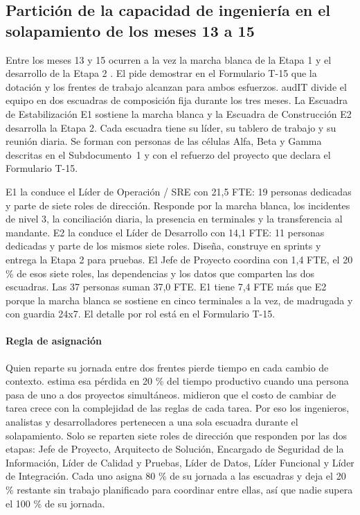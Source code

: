 \subsection{Partición de la capacidad de ingeniería en el solapamiento de los meses 13 a 15}\label{sec:7-particion}

Entre los meses 13 y 15 ocurren a la vez la marcha blanca de la Etapa 1 y el desarrollo de la
Etapa 2 . El  pide demostrar en el Formulario T-15 que la
dotación y los frentes de trabajo alcanzan para ambos esfuerzos. audIT divide el equipo en dos
escuadras de composición fija durante los tres meses. La Escuadra de Estabilización E1 sostiene la
marcha blanca y la Escuadra de Construcción E2 desarrolla la Etapa 2. Cada escuadra tiene su líder,
su tablero de trabajo y su reunión diaria. Se forman con personas de las células Alfa, Beta y Gamma
descritas en el Subdocumento~1 y con el refuerzo del proyecto que declara el Formulario T-15.

E1 la conduce el Líder de Operación / SRE con 21,5 FTE: 19 personas dedicadas y parte de siete roles
de dirección. Responde por la marcha blanca, los incidentes de nivel 3, la conciliación diaria, la
presencia en terminales y la transferencia al mandante. E2 la conduce el Líder de Desarrollo con
14,1 FTE: 11 personas dedicadas y parte de los mismos siete roles. Diseña, construye en sprints y
entrega la Etapa 2 para pruebas. El Jefe de Proyecto coordina con 1,4 FTE, el 20 \% de esos siete
roles, las dependencias y los datos que comparten las dos escuadras. Las 37 personas suman 37,0 FTE.
E1 tiene 7,4 FTE más que E2 porque la marcha blanca se sostiene en cinco terminales a la vez, de
madrugada y con guardia 24x7. El detalle por rol está en el Formulario T-15.

\paragraph{Regla de asignación}
Quien reparte su jornada entre dos frentes pierde tiempo en cada cambio de contexto.
\textcite{weinberg1992} estima esa pérdida en 20 \% del tiempo productivo cuando una persona pasa de
uno a dos proyectos simultáneos. \textcite{rubinstein2001} midieron que el costo de cambiar de tarea
crece con la complejidad de las reglas de cada tarea. Por eso los ingenieros, analistas y
desarrolladores pertenecen a una sola escuadra durante el solapamiento. Solo se reparten siete roles
de dirección que responden por las dos etapas: Jefe de Proyecto, Arquitecto de Solución, Encargado de
Seguridad de la Información, Líder de Calidad y Pruebas, Líder de Datos, Líder Funcional y Líder de
Integración. Cada uno asigna 80 \% de su jornada a las escuadras y deja el 20 \% restante sin trabajo
planificado para coordinar entre ellas, así que nadie supera el 100 \% de su jornada.

